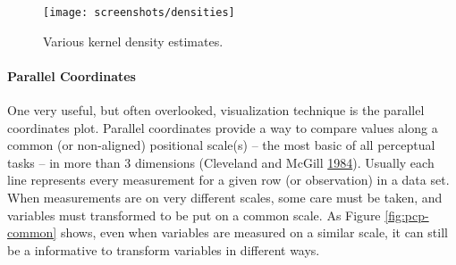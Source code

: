 \documentclass[12pt,]{isuthesis}
\newenvironment{Shaded}{\begin{snugshade}}{\end{snugshade}}
\newcommand{\KeywordTok}[1]{\textcolor[rgb]{0.13,0.29,0.53}{\textbf{{#1}}}}
\newcommand{\DataTypeTok}[1]{\textcolor[rgb]{0.13,0.29,0.53}{{#1}}}
\newcommand{\StringTok}[1]{\textcolor[rgb]{0.31,0.60,0.02}{{#1}}}
\newcommand{\OtherTok}[1]{\textcolor[rgb]{0.56,0.35,0.01}{{#1}}}
\newcommand{\NormalTok}[1]{{#1}}
\let\oldparagraph\paragraph
\renewcommand{\paragraph}[1]{\oldparagraph{#1}\mbox{}}
\begin{document}
\begin{Shaded}
\end{Shaded}

\begin{figure}
\centering
\texttt{[image: screenshots/densities]}
\caption{\label{fig:densities}Various kernel density estimates.}
\end{figure}

\paragraph{Parallel Coordinates}\label{parallel-coordinates}

One very useful, but often overlooked, visualization technique is the
parallel coordinates plot. Parallel coordinates provide a way to compare
values along a common (or non-aligned) positional scale(s) -- the most
basic of all perceptual tasks -- in more than 3 dimensions (Cleveland
and McGill \protect\hyperlink{ref-graphical-perception}{1984}). Usually
each line represents every measurement for a given row (or observation)
in a data set. When measurements are on very different scales, some care
must be taken, and variables must transformed to be put on a common
scale. As Figure \ref{fig:pcp-common} shows, even when variables are
measured on a similar scale, it can still be a informative to transform
variables in different ways.
\end{document}
